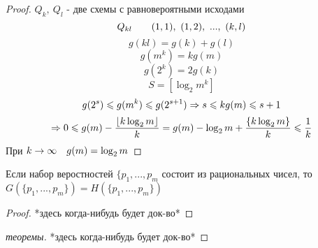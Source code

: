 \documentclass[discrete.tex]{subfiles}
\begin{document}
\begin{proof}
  $Q_k,\ Q_l$ - две схемы с равновероятными исходами
  \[Q_{kl} \qquad (1,1),\ (1,2),\ ...,\ (k,l)\]
  \[g(kl) = g(k) + g(l)\]
  \[g(m^k) = k g(m)\]
  \[g(2^k) = 2 g(k)\]
  \[S = [\log_2 m^k]\]
  \[g(2^s) \leqslant g(m^k) \leqslant g(2^{s+1}) \Rightarrow s \leqslant k g(m) \leqslant s+1\]
  \[\Rightarrow 0 \leqslant g(m) - \frac{\lfloor k \log_2 m\rfloor}{k} = g(m) - \log_2 m + \frac{\{k \log_2 m\}}{k} \leqslant \frac{1}{k}\]
  При $k \rightarrow \infty \quad g(m) = \log_2 m$
\end{proof}

\begin{lemma_2}
  Если набор веростностей $\{p_1,...,p_m$ состоит из рациональных чисел, то $G(\{p_1,...,p_m\}) = H(\{p_1,...,p_m\})$
\end{lemma_2}

\begin{proof}
  *здесь когда-нибудь будет док-во*
\end{proof}

\begin{proof}[теоремы]
  *здесь когда-нибудь будет док-во*
\end{proof}
\end{document}
